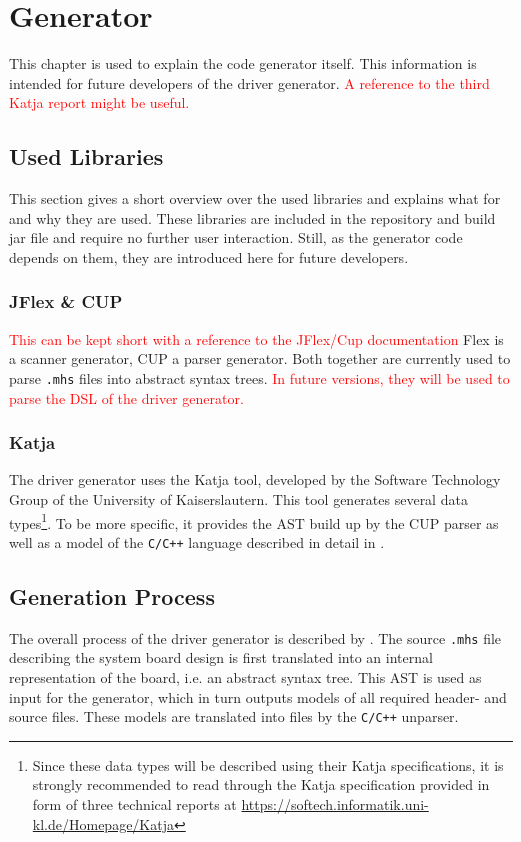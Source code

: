 \documentclass{report}
\begin{document}
\chapter{Generator}
This chapter is used to explain the code generator itself. This information is intended for future developers of the driver generator. \textcolor{red}{A reference to the third Katja report might be useful.}

\section{Used Libraries}
This section gives a short overview over the used libraries and explains what for and why they are used. These libraries are included in the repository and build jar file and require no further user interaction. Still, as the generator code depends on them, they are introduced here for future developers.

\subsection{JFlex \& CUP}
\textcolor{red}{This can be kept short with a reference to the JFlex/Cup documentation}
Flex is a scanner generator, CUP a parser generator. Both together are currently used to parse \texttt{.mhs} files into abstract syntax trees. \textcolor{red}{In future versions, they will be used to parse the DSL of the driver generator.}

\subsection{Katja}
The driver generator uses the Katja tool, developed by the Software Technology Group of the University of Kaiserslautern. This tool generates several data types\footnote{Since these data types will be described using their Katja specifications, it is strongly recommended to read through the Katja specification provided in form of three technical reports at \url{https://softech.informatik.uni-kl.de/Homepage/Katja}}. To be more specific, it provides the AST build up by the CUP parser as well as a model of the \texttt{C/C++} language described in detail in .

\section{Generation Process}
\label{sec:genprocess}
The overall process of the driver generator is described by . The source \texttt{.mhs} file describing the system board design is first translated into an internal representation of the board, i.e. an abstract syntax tree. This AST is used as input for the generator, which in turn outputs models of all required header- and source files. These models are translated into files by the \texttt{C/C++} unparser.
\end{document}
